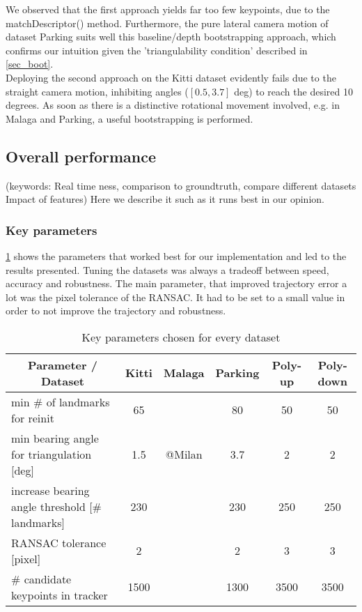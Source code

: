 We observed that the first approach yields far too few keypoints, due to the matchDescriptor() method. Furthermore, the pure lateral camera motion of dataset Parking suits well this baseline/depth bootstrapping approach, which confirms our intuition given the 'triangulability condition' described in \cref{sec_boot}.\\

Deploying the second approach on the Kitti dataset evidently fails due to the straight camera motion, inhibiting angles ($[0.5, 3.7]$ deg) to reach the desired 10 degrees. As soon as there is a distinctive rotational movement involved, e.g. in Malaga and Parking, a useful bootstrapping is performed.


\subsection{Overall performance}
(keywords: Real time ness, comparison to groundtruth, compare different datasets
Impact of features) Here we describe it such as it runs best in our opinion.

\subsubsection{Key parameters}
\cref{params_table} shows the parameters that worked best for our implementation and led to the results presented. Tuning the datasets was always a tradeoff between speed, accuracy and robustness. The main parameter, that improved trajectory error a lot was the pixel tolerance of the RANSAC. It had to be set to a small value in order to not improve the trajectory and robustness.
\begin{table}[!h]
	\centering
	\begin{tabular}{|l|c|c|c|c|c|}
	\hline
	\multicolumn{1}{|c|}{\textbf{Parameter / Dataset}} & \textbf{Kitti} & \textbf{Malaga} & \textbf{Parking} & \textbf{Poly-up} & \textbf{Poly-down} \\ \hline
	min \# of landmarks for reinit                     & 65             &                 & 80               & 50               & 50\\ \hline
	min bearing angle for triangulation {[}deg{]}      & 1.5            &  @Milan         & 3.7              & 2                &
2\\ \hline
	increase bearing angle threshold {[}\# landmarks{]}& 230            &                 & 230              & 250              & 250\\ \hline
	RANSAC tolerance {[}pixel{]}                       & 2              &                 & 2                & 3                &
3\\ \hline
	\# candidate keypoints in tracker                  & 1500           &                 & 1300             & 3500             & 3500\\ \hline
	\end{tabular}
	\caption{Key parameters chosen for every dataset}
	\label{params_table}
\end{table}
	
